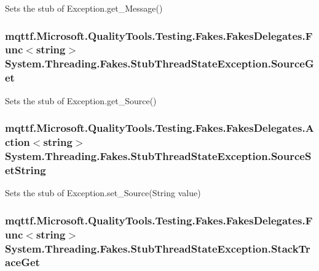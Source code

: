 Sets the stub of Exception.\-get\-\_\-\-Message()

\hypertarget{class_system_1_1_threading_1_1_fakes_1_1_stub_thread_state_exception_ac6fc197d3fe1e2e6247189b7d3045bc8}{
\subsubsection[{Source\-Get}]{\setlength{\rightskip}{0pt plus 5cm}mqttf.\-Microsoft.\-Quality\-Tools.\-Testing.\-Fakes.\-Fakes\-Delegates.\-Func$<$string$>$ System.\-Threading.\-Fakes.\-Stub\-Thread\-State\-Exception.\-Source\-Get}}\label{class_system_1_1_threading_1_1_fakes_1_1_stub_thread_state_exception_ac6fc197d3fe1e2e6247189b7d3045bc8}


Sets the stub of Exception.\-get\-\_\-\-Source()

\hypertarget{class_system_1_1_threading_1_1_fakes_1_1_stub_thread_state_exception_a446a6683e8f15b9fceaebef5ed0aaeeb}{
\subsubsection[{Source\-Set\-String}]{\setlength{\rightskip}{0pt plus 5cm}mqttf.\-Microsoft.\-Quality\-Tools.\-Testing.\-Fakes.\-Fakes\-Delegates.\-Action$<$string$>$ System.\-Threading.\-Fakes.\-Stub\-Thread\-State\-Exception.\-Source\-Set\-String}}\label{class_system_1_1_threading_1_1_fakes_1_1_stub_thread_state_exception_a446a6683e8f15b9fceaebef5ed0aaeeb}


Sets the stub of Exception.\-set\-\_\-\-Source(\-String value)

\hypertarget{class_system_1_1_threading_1_1_fakes_1_1_stub_thread_state_exception_af9b61c1bab2703be74bc949f841ae167}{
\subsubsection[{Stack\-Trace\-Get}]{\setlength{\rightskip}{0pt plus 5cm}mqttf.\-Microsoft.\-Quality\-Tools.\-Testing.\-Fakes.\-Fakes\-Delegates.\-Func$<$string$>$ System.\-Threading.\-Fakes.\-Stub\-Thread\-State\-Exception.\-Stack\-Trace\-Get}}\label{class_system_1_1_threading_1_1_fakes_1_1_stub_thread_state_exception_af9b61c1bab2703be74bc949f841ae167}


